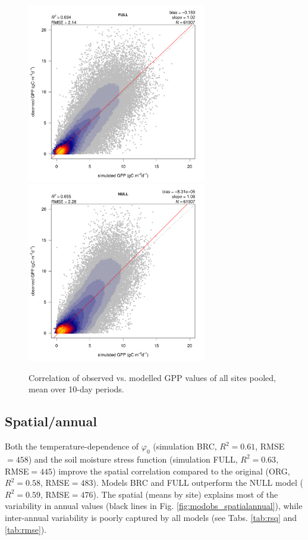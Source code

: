 \documentclass{myreport}
\begin{document}
\begin{figure}[!ht]
    \centering
    \includegraphics[width=0.7\textwidth]{fig/modobs_xdaily_FULL.pdf}
    \includegraphics[width=0.7\textwidth]{fig/modobs_xdaily_NULL.pdf}
    \caption{Correlation of observed vs. modelled GPP values of all sites pooled, mean over 10-day periods.}
    \label{fig:modobs_xdaily}
\end{figure}

\clearpage

\subsection{Spatial/annual}

Both the temperature-dependence of $\varphi_0$ (simulation BRC, $R^2=0.61$, RMSE$=458$) and the soil moisture stress function (simulation FULL, $R^2=0.63$, RMSE$=445$) improve the spatial correlation compared to the original (ORG, $R^2=0.58$, RMSE$=483$). Models BRC and FULL outperform the NULL model ($R^2=0.59$, RMSE$=476$). The spatial (means by site) explains most of the variability in annual values (black lines in Fig. \ref{fig:modobs_spatialannual}), while inter-annual variability is poorly captured by all models (see Tabs. \ref{tab:rsq} and \ref{tab:rmse}).
\end{document}
